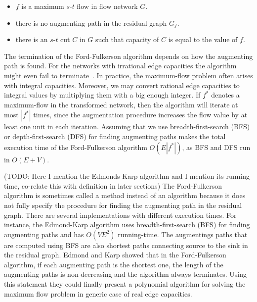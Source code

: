 \documentclass{llncs}
\begin{document}
\begin{itemize}
\item $f$ is a maximum $s$-$t$ flow in flow network $G$.
\item there is no augmenting path in the residual graph $G_f$.
\item there is an $s$-$t$ cut $C$ in $G$ such that capacity of $C$ is equal to the value of $f$.
\end{itemize}

The termination of the Ford-Fulkerson algorithm depends on how the augmenting path is found. For the networks with irrational edge capacities the algorithm might even fail to terminate~\cite{Zwick95}. In practice, the maximum-flow problem often arises with integral capacities. Moreover, we may convert rational edge capacities to integral values by multiplying them with a big enough integer. If $f^*$ denotes a maximum-flow in the transformed network, then the algorithm will iterate at most $|f^*|$ times, since the augmentation procedure increases the flow value by at least one unit in each iteration. Assuming that we use breadth-first-search (BFS) or depth-first-search (DFS) for finding augmenting paths makes the total execution time of the Ford-Fulkerson algorithm $O ( E | f^* |)$, as BFS and DFS run in $O (E + V)$.

(TODO: Here I mention the Edmonds-Karp algorithm and I mention its running time, co-relate this with definition in later sections) The Ford-Fulkerson algorithm is sometimes called a method instead of an algorithm because it does not fully specify the procedure for finding the augmenting path in the residual graph. There are several implementations with different execution times. For instance, the Edmond-Karp algorithm uses breadth-first-search (BFS) for finding augmenting paths and has $O (VE^2)$ running-time. The augmentings paths that are computed using BFS are also shortest paths connecting source to the sink in the residual graph. Edmond and Karp showed that in the Ford-Fulkerson algorithm, if each augmenting path is the shortest one, the length of the augmenting paths is non-decreasing and the algorithm always terminates. Using this statement they could finally present a polynomial algorithm for solving the maximum flow problem in generic case of real edge capacities.
\end{document}

